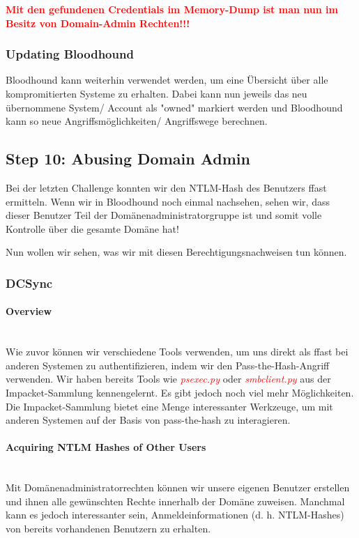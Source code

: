 \textcolor{red}{\textbf{Mit den gefundenen Credentials im Memory-Dump ist man nun im Besitz von Domain-Admin Rechten!!!}}

\subsubsection{Updating Bloodhound}
Bloodhound kann weiterhin verwendet werden, um eine Übersicht über alle kompromitierten Systeme zu erhalten. Dabei kann nun jeweils das neu übernommene System/ Account als "owned" markiert werden und Bloodhound kann so neue Angriffsmöglichkeiten/ Angriffswege berechnen.

\subsection{Step 10: Abusing Domain Admin}
Bei der letzten Challenge konnten wir den NTLM-Hash des Benutzers ffast ermitteln. Wenn wir in Bloodhound noch einmal nachsehen, sehen wir, dass dieser Benutzer Teil der Domänenadministratorgruppe ist und somit volle Kontrolle über die gesamte Domäne hat!

Nun wollen wir sehen, was wir mit diesen Berechtigungsnachweisen tun können.

\subsubsection{DCSync}

\paragraph{Overview}\mbox{} \\
Wie zuvor können wir verschiedene Tools verwenden, um uns direkt als ffast bei anderen Systemen zu authentifizieren, indem wir den Pass-the-Hash-Angriff verwenden. Wir haben bereits Tools wie \textcolor{red}{\textit{psexec.py}} oder \textcolor{red}{\textit{smbclient.py}} aus der Impacket-Sammlung kennengelernt.
Es gibt jedoch noch viel mehr Möglichkeiten. Die Impacket-Sammlung bietet eine Menge interessanter Werkzeuge, um mit anderen Systemen auf der Basis von pass-the-hash zu interagieren.

\paragraph{Acquiring NTLM Hashes of Other Users}\mbox{} \\
Mit Domänenadministratorrechten können wir unsere eigenen Benutzer erstellen und ihnen alle gewünschten Rechte innerhalb der Domäne zuweisen. Manchmal kann es jedoch interessanter sein, Anmeldeinformationen (d. h. NTLM-Hashes) von bereits vorhandenen Benutzern zu erhalten.\\

